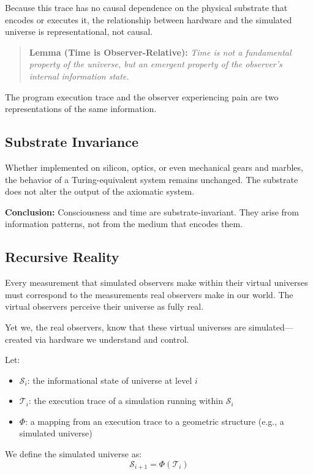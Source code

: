 \documentclass[11pt]{article}
\begin{document}
Because this trace has no causal dependence on the physical substrate that encodes or executes it, the relationship between hardware and the simulated universe is representational, not causal.

\begin{quote}
  \textbf{Lemma (Time is Observer-Relative):} \emph{Time is not a fundamental property of the universe, but an emergent property of the observer’s internal information state.}
\end{quote}

The program execution trace and the observer experiencing pain are two representations of the same information.

\subsection{Substrate Invariance}

Whether implemented on silicon, optics, or even mechanical gears and marbles, the behavior of a Turing-equivalent system remains unchanged. The substrate does not alter the output of the axiomatic system.

\textbf{Conclusion:} Consciousness and time are substrate-invariant. They arise from information patterns, not from the medium that encodes them.

\subsection{Recursive Reality}

Every measurement that simulated observers make within their virtual universes must correspond to the measurements real observers make in our world. The virtual observers perceive their universe as fully real.

Yet we, the real observers, know that these virtual universes are simulated—created via hardware we understand and control.

Let:
\begin{itemize}
  \item \( \mathcal{S}_i \): the informational state of universe at level \( i \)
  \item \( \mathcal{T}_i \): the execution trace of a simulation running within \( \mathcal{S}_i \)
  \item \( \Phi \): a mapping from an execution trace to a geometric structure (e.g., a simulated universe)
\end{itemize}

We define the simulated universe as:
\[
  \mathcal{S}_{i+1} = \Phi(\mathcal{T}_i)
\]
\end{document}
